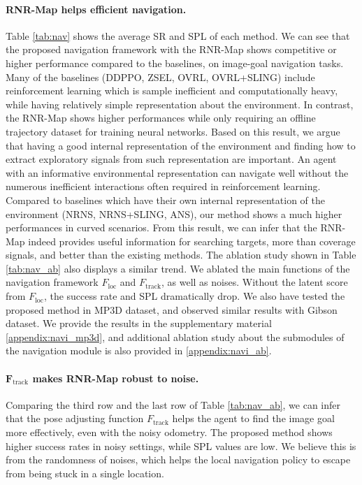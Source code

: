 \documentclass[10pt,twocolumn,letterpaper]{article}
\def\proposed{RNR-Map\xspace}
\begin{document}
\paragraph{\proposed helps efficient navigation.}
Table \ref{tab:nav} shows the average SR and SPL of each method.
%
We can see that the proposed navigation framework with the \proposed shows competitive or higher performance compared to the baselines, on image-goal navigation tasks.
%
Many of the baselines (DDPPO, ZSEL, OVRL, OVRL+SLING) include reinforcement learning which is sample inefficient and computationally heavy, while having relatively simple representation about the environment. 
%
In contrast, the \proposed shows higher performances while only requiring an offline trajectory dataset for training neural networks.
%
Based on this result, we argue that having a good internal representation of the environment and finding how to extract exploratory signals from such representation are important.
%
An agent with an informative environmental representation can navigate well without the numerous inefficient interactions often required in reinforcement learning.
%
Compared to baselines which have their own internal representation of the environment (NRNS, NRNS+SLING, ANS), our method shows a much higher performances in curved scenarios.
%
From this result, we can infer that the \proposed indeed provides useful information for searching targets, more than coverage signals, and better than the existing methods.
%
The ablation study shown in Table \ref{tab:nav_ab} also displays a similar trend.
%
We ablated the main functions of the navigation framework $F_\mathrm{loc}$ and $F_\mathrm{track}$, as well as noises.
%
Without the latent score from $F_\mathrm{loc}$, the success rate and SPL dramatically drop.
%
We also have tested the proposed method in MP3D \cite{mp3d} dataset, and observed similar results with Gibson dataset. We provide the results in the supplementary material \ref{appendix:navi_mp3d}, and additional ablation study about the submodules of the navigation module is also provided in \ref{appendix:navi_ab}.
\vspace{-3mm}
\paragraph{$\mathbf{F_\mathrm{track}}$ makes \proposed robust to noise.}
Comparing the third row and the last row of Table \ref{tab:nav_ab}, we can infer that the pose adjusting function $F_\mathrm{track}$ helps the agent to find the image goal more effectively, even with the noisy odometry. 
%
%
The proposed method shows higher success rates in noisy settings, while SPL values are low.
%
We believe this is from the randomness of noises, which helps the local navigation policy to escape from being stuck in a single location.
\end{document}
